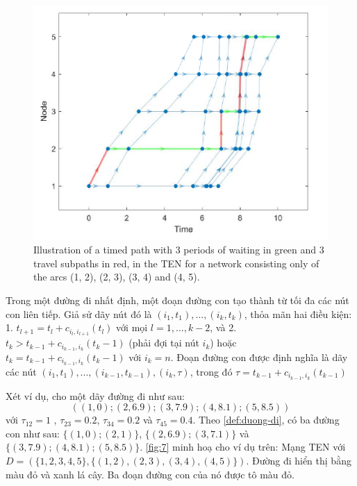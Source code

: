 \documentclass[../main.tex]{subfiles}
\begin{document}
\begin{figure}
\centering
\includegraphics{images/Figure7.png}
\caption{Illustration of a timed path with 3 periods of
waiting in green and 3 travel subpaths in red, in the TEN for a network
consisting only of the arcs (1, 2), (2, 3), (3, 4) and (4, 5).}
\label{fig:7}
\end{figure}

\begin{definition}
\label{def:duong-di}
Trong một đường đi nhất định, một đoạn
đường con tạo thành từ tối đa các nút con liên tiếp. Giả sử dãy nút đó
là \((i_1, t_1),...,(i_k, t_k)\), thỏa mãn hai điều kiện: 1.
\(t_{l+1} =t_l + c_{i_l, i_{l+1}}(t_l)\) với mọi \(l = 1,\dots, k-2\),
và 2. \(t_k > t_{k-1} + c_{i_{k-1}, i_k}(t_k-1)\) (phải đợi tại nút
\(i_k\)) hoặc \(t_k = t_{k-1} + c_{i_{k-1}, i_k}(t_k-1)\) với \(i_k=n\).
Đoạn đường con được định nghĩa là dãy các nút
\((i_1, t_1),...,(i_{k-1}, t_{k-1}), (i_k, \tau)\), trong đó
\(\tau = t_{k−1} + c_{i_{k−1},i_k}(t_{k−1})\)
\end{definition}

Xét ví dụ, cho một dãy đường đi như sau:
\[((1,0);(2,6.9);(3,7.9);(4,8.1);(5,8.5))\] với \(\tau_{12} = 1\) ,
\(\tau_{23} = 0.2\), \(\tau_{34} = 0.2\) và \(\tau_{45} = 0.4\). Theo
\autoref{def:duong-di}, có ba đường con như sau: \(\{(1, 0); (2, 1)\}\),
\(\{(2, 6.9); (3, 7.1)\}\) và \(\{(3, 7.9); (4, 8.1); (5, 8.5)\}\). \autoref{fig:7} minh hoạ cho ví dụ trên: Mạng TEN với
\(D = (\{1, 2, 3, 4, 5\}, \{(1, 2), (2, 3), (3, 4), (4, 5)\})\). Đường
đi hiển thị bằng màu đỏ và xanh lá cây. Ba đoạn đường con của nó được tô
màu đỏ.
\end{document}

